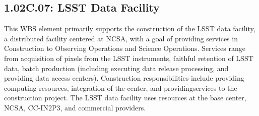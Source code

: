 \subsection*{1.02C.07: LSST Data Facility}

This WBS element primarily supports the construction of the LSST data facility, a distributed facility centered at NCSA, with a goal of providing services in Construction to Observing Operations and Science Operations.
Services range from acquisition of pixels from the LSST instruments, faithful retention of LSST data, batch production (including executing data release processing, and providing data access centers).
Construction responsibilities include providing computing resources, integration of the center, and providingservices to the construction project.
The LSST data facility uses resources at the base center, NCSA, CC-IN2P3, and commercial providers.
